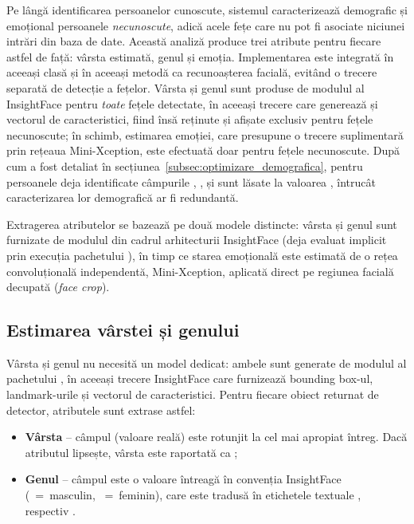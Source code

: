 \documentclass[../../main.tex]{subfiles}
\begin{document}
Pe lângă identificarea persoanelor cunoscute, sistemul caracterizează demografic și
emoțional persoanele \textit{necunoscute}, adică acele fețe care nu pot fi asociate
niciunei intrări din baza de date. Această analiză produce trei atribute pentru
fiecare astfel de față: vârsta estimată, genul și emoția. Implementarea este integrată
în aceeași clasă  și în aceeași metodă
 ca recunoașterea facială, evitând o trecere separată de
detecție a fețelor. Vârsta și genul sunt produse de modulul  al InsightFace pentru \emph{toate} fețele detectate, în aceeași trecere care generează și vectorul de caracteristici, fiind însă reținute și afișate exclusiv pentru fețele necunoscute; în schimb, estimarea emoției, care presupune o trecere suplimentară prin rețeaua Mini-Xception, este efectuată doar pentru fețele necunoscute. După cum a fost detaliat în secțiunea~\ref{subsec:optimizare_demografica}, pentru persoanele deja identificate câmpurile , ,  și  sunt lăsate la valoarea , întrucât caracterizarea lor demografică ar fi redundantă.

Extragerea atributelor se bazează pe două modele distincte: vârsta și genul sunt furnizate de modulul  din cadrul arhitecturii InsightFace (deja evaluat implicit prin execuția pachetului ), în timp ce starea emoțională este estimată de o rețea convoluțională independentă, Mini-Xception, aplicată direct pe regiunea facială decupată (\emph{face crop}).

\subsection{Estimarea vârstei și genului}
\label{subsec:varsta_gen}

Vârsta și genul nu necesită un model dedicat: ambele sunt generate de modulul
 al pachetului , în aceeași trecere
InsightFace care furnizează bounding box-ul, landmark-urile și vectorul de caracteristici. Pentru
fiecare obiect  returnat de detector, atributele sunt extrase astfel:

\begin{itemize}
    \item \textbf{Vârsta} -- câmpul  (valoare reală) este rotunjit
    la cel mai apropiat întreg. Dacă atributul lipsește, vârsta este raportată ca
    ;
    \item \textbf{Genul} -- câmpul  este o valoare întreagă în
    convenția InsightFace (~=~masculin, ~=~feminin), care este
    tradusă în etichetele textuale , respectiv .
\end{itemize}
\end{document}
